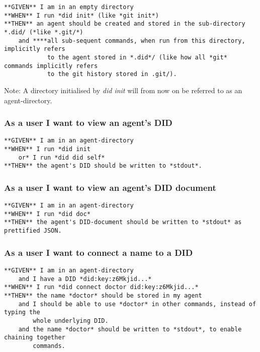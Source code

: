 \begin{lstlisting}
**GIVEN** I am in an empty directory
**WHEN** I run *did init* (like *git init*)
**THEN** an agent should be created and stored in the sub-directory *.did/ (*like *.git/*)
    and ****all sub-sequent commands, when run from this directory, implicitly refers 
            to the agent stored in *.did*/ (like how all *git* commands implicitly refers
            to the git history stored in .git/).
\end{lstlisting}

Note: A directory initialised by \emph{did init} will from now on be
referred to as an agent-directory.

\hypertarget{as-a-user-i-want-to-view-an-agents-did}{%
\subsubsection{As a user I want to view an agent's
DID}\label{as-a-user-i-want-to-view-an-agents-did}}

\begin{lstlisting}
**GIVEN** I am in an agent-directory
**WHEN** I run *did init
    or* I run *did did self*
**THEN** the agent's DID should be written to *stdout*.
\end{lstlisting}

\hypertarget{as-a-user-i-want-to-view-an-agents-did-document}{%
\subsubsection{As a user I want to view an agent's DID
document}\label{as-a-user-i-want-to-view-an-agents-did-document}}

\begin{lstlisting}
**GIVEN** I am in an agent-directory
**WHEN** I run *did doc*
**THEN** the agent's DID-document should be written to *stdout* as prettified JSON.
\end{lstlisting}

\hypertarget{as-a-user-i-want-to-connect-a-name-to-a-did}{%
\subsubsection{As a user I want to connect a name to a
DID}\label{as-a-user-i-want-to-connect-a-name-to-a-did}}

\begin{lstlisting}
**GIVEN** I am in an agent-directory
    and I have a DID *did:key:z6Mkjid...*
**WHEN** I run *did connect doctor did:key:z6Mkjid...*
**THEN** the name *doctor* should be stored in my agent
    and I should be able to use *doctor* in other commands, instead of typing the 
        whole underlying DID.
    and the name *doctor* should be written to *stdout*, to enable chaining together 
        commands.
\end{lstlisting}

